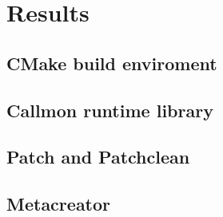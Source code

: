\section{Results}

\subsection{CMake build enviroment} 

\subsection{Callmon runtime library} 

\subsection{Patch and Patchclean} 

\subsection{Metacreator} 
